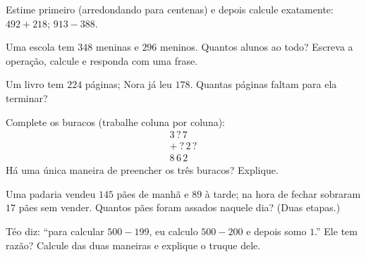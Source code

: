 \begin{exercise}[$\star$]\label{exo:g3:addsub:6}
Estime primeiro (arredondando para centenas) e depois calcule
exatamente: $492 + 218$; \quad $913 - 388$.
\end{exercise}

\begin{exercise}[$\star$]\label{exo:g3:addsub:7}
Uma escola tem $348$ meninas e $296$ meninos. Quantos alunos ao
todo? Escreva a operação, calcule e responda com uma frase.
\end{exercise}

\begin{exercise}[$\star$]\label{exo:g3:addsub:8}
Um livro tem $224$ páginas; Nora já leu $178$. Quantas páginas
faltam para ela terminar?
\end{exercise}

\begin{exercise}[$\star$]\label{exo:g3:addsub:9}
Complete os buracos (trabalhe coluna por coluna):
\[
\begin{array}{r}
3\,?\,7 \\
+\ ?\,2\,? \\
\hline
8\,6\,2
\end{array}
\]
Há uma única maneira de preencher os três buracos? Explique.
\end{exercise}

\begin{exercise}[$\star\star$]\label{exo:g3:addsub:10}
Uma padaria vendeu $145$ pães de manhã e $89$ à tarde; na hora de
fechar sobraram $17$ pães sem vender. Quantos pães foram assados
naquele dia? (Duas etapas.)
\end{exercise}

\begin{exercise}[$\star\star$]\label{exo:g3:addsub:11}
Téo diz: ``para calcular $500 - 199$, eu calculo $500 - 200$ e
depois somo $1$.'' Ele tem razão? Calcule das duas maneiras e
explique o truque dele.
\end{exercise}

